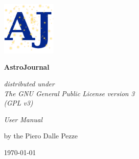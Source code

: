 \documentclass[10pt,a4paper,oneside]{article}
\begin{document}
\hypersetup{pageanchor=false}
\begin{titlepage}
	\centering
	\includegraphics[width=0.2\textwidth]{../src/main/resources/graphics/logo/aj_icon_256}\par\vspace{1cm}
	{\Huge\bfseries AstroJournal\par}
	\vspace{1cm}	
	{\Large\itshape distributed under \\
	The GNU General Public License version 3 \\
	(GPL v3)\par}
	
	\vspace{2cm}
	{\huge\itshape User Manual\par}
	\vfill
	{\Large by the Piero Dalle Pezze\par}
	\vfill
	{\Large \today\par}
\end{titlepage}
\hypersetup{pageanchor=true}


\clearpage
\thispagestyle{empty}

\tableofcontents
\listoffigures
\newpage
{}





\end{document}
